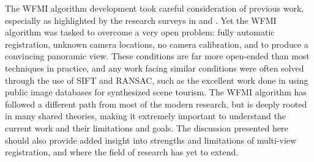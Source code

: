    The WFMI algorithm development took careful consideration of previous work, especially as highlighted by the research surveys in \cite{Zitova2003} and \cite{Pluim2003}. Yet the WFMI algorithm was tasked to overcome a very open problem: fully automatic registration, unknown camera locations, no camera calibration, and to produce a convincing panoramic view. These conditions are far more open-ended than most techniques in practice, and any work facing similar conditions were often solved through the use of SIFT and RANSAC, such as the excellent work done in \cite{Snavely2008} using public image databases for synthesized scene tourism. The WFMI algorithm has followed a different path from most of the modern research, but is deeply rooted in many shared theories, making it extremely important to understand the current work and their limitations and goals. The discussion presented here should also provide added insight into strengths and limitations of multi-view registration, and where the field of research has yet to extend.
 
 


